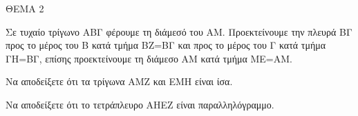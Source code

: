 
ΘΕΜΑ 2

Σε τυχαίο τρίγωνο ΑΒΓ φέρουμε τη διάμεσό του ΑΜ. Προεκτείνουμε την πλευρά ΒΓ προς το μέρος του Β κατά τμήμα ΒΖ=ΒΓ και προς το μέρος του Γ κατά τμήμα ΓΗ=ΒΓ, επίσης προεκτείνουμε τη διάμεσο ΑΜ κατά τμήμα ΜΕ=ΑΜ.

\begin{alist}
\item Να αποδείξετε ότι τα τρίγωνα ΑΜΖ και ΕΜΗ είναι ίσα. 

\item Να αποδείξετε ότι το τετράπλευρο ΑΗΕΖ είναι παραλληλόγραμμο. 
\end{alist}

